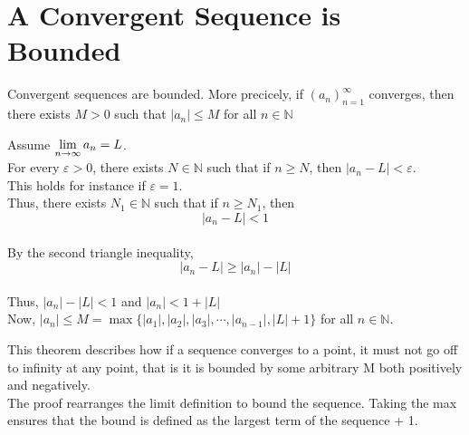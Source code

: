 \documentclass[12pt]{article}
\begin{document}
\section{A Convergent Sequence is Bounded}
\begin{theo}{}
    Convergent sequences are bounded. More precicely, if $(a_n)_{n=1}^\infty$ converges, then there exists $M > 0$ such that $|a_n| \le M$ for all $n \in \mathbb N$\\
\end{theo}
\begin{prf}{}
    Assume $\displaystyle\lim_{n\to\infty}{a_n} = L$.\\
For every $\varepsilon > 0$, there exists $N \in \mathbb N$ such that if $n \ge N$, then $|a_n - L| < \varepsilon$.\\
This holds for instance if $\varepsilon = 1$.\\
Thus, there exists $N_1 \in \mathbb N$ such that if $n \ge N_1$, then $$|a_n - L| < 1$$\\
By the second triangle inequality, $$|a_n - L| \ge |a_n| - |L|$$\\
Thus, $|a_n| - |L| < 1$ and $|a_n| < 1 + |L|$ \\
Now, $|a_n| \le M = \max\{|a_1|, |a_2|, |a_3|, \cdots, |a_{n-1}|, |L| + 1\}$ for all $n \in \mathbb N$.
\end{prf}
\newpage
\begin{explanation}{}
This theorem describes how if a sequence converges to a point, it must not go off to infinity at any point, that is it is bounded by some arbitrary M both positively and negatively.\\
The proof rearranges the limit definition to bound the sequence. Taking the max ensures that the bound is defined as the largest term of the sequence + 1.\\
\end{explanation}
\end{document}

